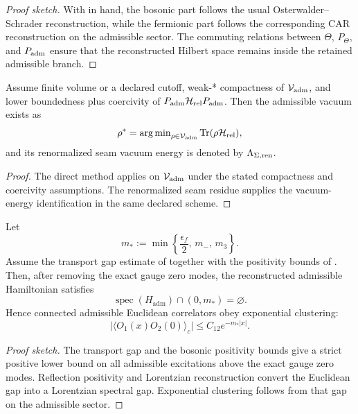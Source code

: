 \begin{proof}[Proof sketch]
With  in hand, the bosonic part follows the usual Osterwalder--Schrader reconstruction, while the fermionic part follows the corresponding CAR reconstruction on the admissible sector. The commuting relations between $\Theta$, $P_\Theta$, and $P_{\mathrm{adm}}$ ensure that the reconstructed Hilbert space remains inside the retained admissible branch.
\end{proof}

\begin{theorem}
\label{thm:admissible-vacuum-existence}
Assume finite volume or a declared cutoff, weak-* compactness of $\mathcal V_{\mathrm{adm}}$, and
lower boundedness plus coercivity of $P_{\mathrm{adm}}\mathcal H_{\mathrm{rel}}P_{\mathrm{adm}}$. Then the admissible
vacuum exists as
\[
\rho^\ast=\operatorname{arg\,min}_{\rho\in\mathcal V_{\mathrm{adm}}}\operatorname{Tr}(\rho\mathcal H_{\mathrm{rel}}),
\]
and its renormalized seam vacuum energy is denoted by $\Lambda_{\Sigma,\mathrm{ren}}$.
\end{theorem}

\begin{proof}
The direct method applies on $\mathcal V_{\mathrm{adm}}$ under the stated compactness and coercivity
assumptions. The renormalized seam residue supplies the vacuum-energy
identification in the same declared scheme.
\end{proof}

\begin{theorem}
\label{thm:nonperturbative-admissible-qft}
Let
\[
m_*:=\min\left\{\frac{\epsilon_f}{2},\,m_-,\,m_3\right\}.
\]
Assume the transport gap estimate of  together with the positivity bounds of . Then, after removing the exact gauge zero modes, the reconstructed admissible Hamiltonian satisfies
\[
\operatorname{spec}(H_{\mathrm{adm}})\cap(0,m_*)=\varnothing.
\]
Hence connected admissible Euclidean correlators obey exponential clustering:
\[
\bigl|\langle O_1(x)O_2(0)\rangle_c\bigr|
\le
C_{12}e^{-m_*|x|}.
\]
\end{theorem}

\begin{proof}[Proof sketch]
The transport gap and the bosonic positivity bounds give a strict positive lower bound on all admissible excitations above the exact gauge zero modes. Reflection positivity and Lorentzian reconstruction convert the Euclidean gap into a Lorentzian spectral gap. Exponential clustering follows from that gap on the admissible sector.
\end{proof}

